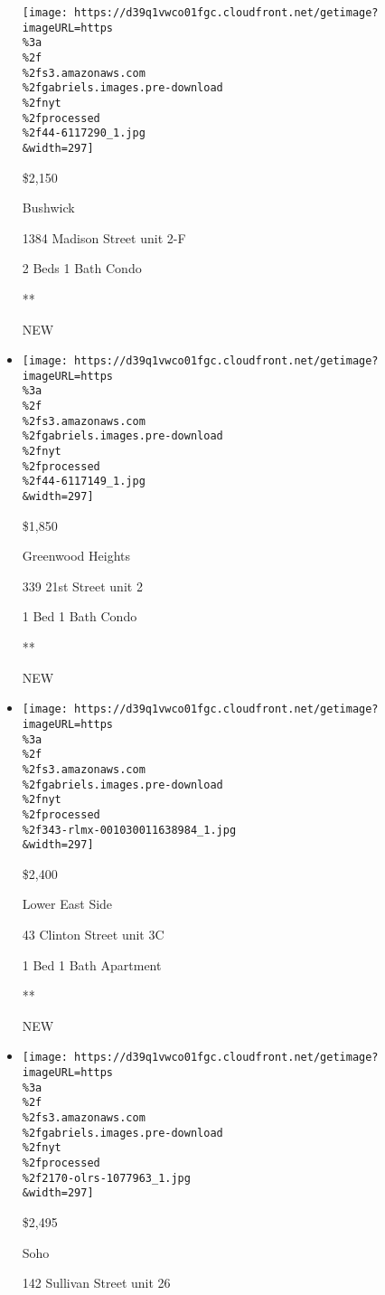 \begin{itemize}
  \texttt{[image: https://d39q1vwco01fgc.cloudfront.net/getimage?imageURL=https\\\%3a\\\%2f\\\%2fs3.amazonaws.com\\\%2fgabriels.images.pre-download\\\%2fnyt\\\%2fprocessed\\\%2f44-6117290\_1.jpg\\\&width=297]}

  \$2,150

  Bushwick

  1384 Madison Street unit 2-F

  2 Beds \textbar{} 1 Bath \textbar{} Condo

  **

  NEW
\item
  \href{/real-estate/usa/ny/brooklyn/greenwood-heights/homes-for-rent/339-21st-street/44-6117149?}{}

  \texttt{[image: https://d39q1vwco01fgc.cloudfront.net/getimage?imageURL=https\\\%3a\\\%2f\\\%2fs3.amazonaws.com\\\%2fgabriels.images.pre-download\\\%2fnyt\\\%2fprocessed\\\%2f44-6117149\_1.jpg\\\&width=297]}

  \$1,850

  Greenwood Heights

  339 21st Street unit 2

  1 Bed \textbar{} 1 Bath \textbar{} Condo

  **

  NEW
\item
  \href{/real-estate/usa/ny/new-york/lower-east-side/homes-for-rent/43-clinton-street/343-RLMX-001030011638984?}{}

  \texttt{[image: https://d39q1vwco01fgc.cloudfront.net/getimage?imageURL=https\\\%3a\\\%2f\\\%2fs3.amazonaws.com\\\%2fgabriels.images.pre-download\\\%2fnyt\\\%2fprocessed\\\%2f343-rlmx-001030011638984\_1.jpg\\\&width=297]}

  \$2,400

  Lower East Side

  43 Clinton Street unit 3C

  1 Bed \textbar{} 1 Bath \textbar{} Apartment

  **

  NEW
\item
  \href{/real-estate/usa/ny/new-york/soho/homes-for-rent/142-sullivan-street/2170-OLRS-1077963?}{}

  \texttt{[image: https://d39q1vwco01fgc.cloudfront.net/getimage?imageURL=https\\\%3a\\\%2f\\\%2fs3.amazonaws.com\\\%2fgabriels.images.pre-download\\\%2fnyt\\\%2fprocessed\\\%2f2170-olrs-1077963\_1.jpg\\\&width=297]}

  \$2,495

  Soho

  142 Sullivan Street unit 26


\end{itemize}
